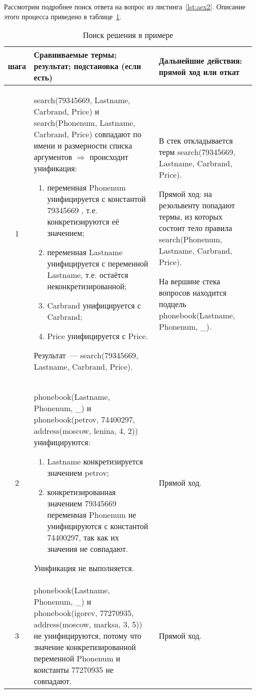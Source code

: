 Рассмотрим подробнее поиск ответа на вопрос из листинга~\ref{lst:aex2}. Описание этого процесса приведено в таблице~\ref{tbl:ex1}.
\renewcommand{\arraystretch}{1.75}
\footnotesize
\begin{longtable}{|c|p{}|p{}|}
    \caption{Поиск решения в примере }\label{tbl:ex1} \\
    \hline
    \textnumero{} шага & Сравниваемые термы; результат; подстановка (если есть)  & Дальнейшие действия: прямой ход или откат \\
    \hline
        1 & search(79345669, Lastname, Carbrand, Price) и search(Phonenum, Lastname, Carbrand, Price) совпадают по имени и размерности списка аргументов $\Rightarrow$ происходит унификация:
        \begin{enumerate}[label=\arabic*)]
			\item переменная Phonenum унифицируется с константой 79345669 , т.е. конкретизируются её значением;
			\item переменная Lastname унифицируется с переменной Lastname, т.е. остаётся неконкретизированной;
			\item Carbrand унифицируется с Carbrand;
			\item Price унифицируется с Price.
 		\end{enumerate}
        Результат~--- search(79345669, Lastname, Carbrand, Price). &
        В стек откладывается терм search(79345669, Lastname, Carbrand, Price).

        Прямой ход: на резольвенту попадают термы, из которых состоит тело правила search(Phonenum, Lastname, Carbrand, Price).

        На вершине стека вопросов находится подцель phonebook(Lastname, Phonenum, \_).
        \\ \hline
        2 & phonebook(Lastname, Phonenum, \_) и phonebook(petrov, 74400297, address(moscow,    lenina,       4,  2)) унифицируются:
        \begin{enumerate}[label=\arabic*)]
            \item Lastname конкретизируется значением petrov;
            \item конкретизированная значением 79345669 переменная Phonenum не унифицируются с константой 74400297, так как их значения не совпадают.
        \end{enumerate}
        Унификация не выполняется. & Прямой ход. \\ \hline

        3 & phonebook(Lastname, Phonenum, \_) и phonebook(igorev, 77270935, address(moscow,    marksa,       3,  5)) не унифицируются, потому что значение конкретизированной переменной Phonenum и константы 77270935 не совпадают. & Прямой ход. \\ \hline


\end{longtable}
